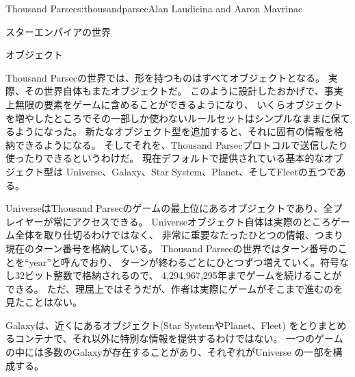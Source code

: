 \begin{aosachapter}{Thousand Parsec}{s:thousandparsec}{Alan Laudicina and Aaron Mavrinac}
\begin{aosasect1}{スターエンパイアの世界}
\begin{aosasect2}{オブジェクト}

Thousand Parsecの世界では、形を持つものはすべてオブジェクトとなる。
実際、その世界自体もまたオブジェクトだ。
このように設計したおかげで、事実上無限の要素をゲームに含めることができるようになり、
いくらオブジェクトを増やしたところでその一部しか使わないルールセットはシンプルなままに保てるようになった。
新たなオブジェクト型を追加すると、それに固有の情報を格納できるようになる。
そしてそれを、Thousand Parsecプロトコルで送信したり使ったりできるというわけだ。
現在デフォルトで提供されている基本的なオブジェクト型は
Universe、Galaxy、Star System、Planet、そしてFleetの五つである。

UniverseはThousand Parsecのゲームの最上位にあるオブジェクトであり、全プレイヤーが常にアクセスできる。
Universeオブジェクト自体は実際のところゲーム全体を取り仕切るわけではなく、
非常に重要なたったひとつの情報、つまり現在のターン番号を格納している。
Thousand Parsecの世界ではターン番号のことを``year''と呼んでおり、
ターンが終わるごとにひとつずつ増えていく。符号なし32ビット整数で格納されるので、
4,294,967,295年までゲームを続けることができる。
ただ、理屈上ではそうだが、作者は実際にゲームがそこまで進むのを見たことはない。

Galaxyは、近くにあるオブジェクト(Star SystemやPlanet、Fleet)
をとりまとめるコンテナで、それ以外に特別な情報を提供するわけではない。
一つのゲームの中には多数のGalaxyが存在することがあり、それぞれがUniverse
の一部を構成する。


\end{aosasect2}
\end{aosasect1}
\end{aosachapter}
